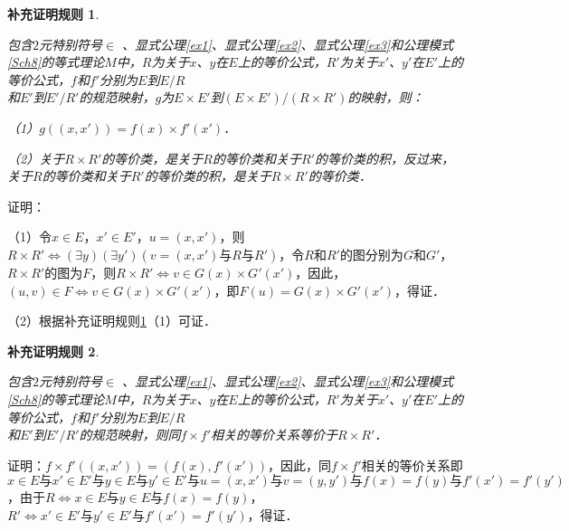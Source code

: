 \documentclass[12pt, a4paper, oneside]{book}
\newtheorem{Ccor}{补充证明规则}
\begin{document}
			\begin{Ccor}\label{Ccor62}
				\hfill\par
				包含$2$元特别符号$\in$ 、显式公理\ref{ex1}、显式公理\ref{ex2}、显式公理\ref{ex3}和公理模式\ref{Sch8}的等式理论$M$中，$R$为关于$x$、$y$在$E$上的等价公式，$R'$为关于$x'$、$y'$在$E'$上的等价公式，$f$和$f'$分别为$E$到$E/R$\\和$E'$到$E'/R'$的规范映射，$g$为$E\times E'$到$(E\times E')/(R\times R')$的映射，则：
				\par
				（1）$g((x, x'))=f(x)\times f'(x')$．
				\par
				（2）关于$R\times R'$的等价类，是关于$R$的等价类和关于$R'$的等价类的积，反过来，关于$R$的等价类和关于$R'$的等价类的积，是关于$R\times R'$的等价类．
			\end{Ccor}
			证明：
			\par
			（1）令$x\in E$，$x'\in E'$，$u=(x, x')$，则$R\times R'\Leftrightarrow (\exists y)(\exists y')(v=(x, x')\text{与}R\text{与}R')$，令$R$和$R'$的图分别为$G$和$G'$，$R\times R'$的图为$F$，则$R\times R'\Leftrightarrow v\in G(x)\times G'(x')$，因此，$(u, v)\in F\Leftrightarrow v\in G(x)\times G'(x')$，即$F(u)= G(x)\times G'(x')$，得证．
			\par
			（2）根据补充证明规则\ref{Ccor62}（1）可证．
			
			\begin{Ccor}\label{Ccor63}
				\hfill\par
				包含$2$元特别符号$\in$ 、显式公理\ref{ex1}、显式公理\ref{ex2}、显式公理\ref{ex3}和公理模式\ref{Sch8}的等式理论$M$中，$R$为关于$x$、$y$在$E$上的等价公式，$R'$为关于$x'$、$y'$在$E'$上的等价公式，$f$和$f'$分别为$E$到$E/R$\\和$E'$到$E'/R'$的规范映射，则同$f\times f'$相关的等价关系等价于$R\times R'$．
			\end{Ccor}
			证明：$f\times f'((x, x'))=(f(x), f'(x'))$，因此，同$f\times f'$相关的等价关系即$x\in E\text{与}x'\in E'\text{与}y\in E\text{与}y'\in E'\text{与}u=(x, x')\text{与}v=(y, y')\text{与}f(x)=f(y)\text{与}f'(x')=f'(y')$，由于$R\Leftrightarrow x\in E\text{与}y\in E\text{与}f(x)=f(y)$，$R'\Leftrightarrow x'\in E'\text{与}y'\in E'\text{与}f'(x')=f'(y')$，得证．
			
\end{document}
